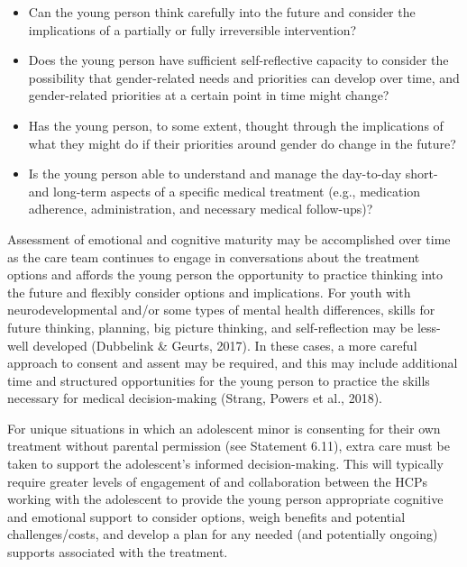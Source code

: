 \documentclass[
]{book}
\providecommand{\tightlist}{%
  \setlength{\itemsep}{0pt}\setlength{\parskip}{0pt}}
\begin{document}
\begin{itemize}
\tightlist
\item
  Can the young person think carefully into the future and consider the implications of a partially or fully irreversible intervention?
\item
  Does the young person have sufficient self-reflective capacity to consider the possibility that gender-related needs and priorities can develop over time, and gender-related priorities at a certain point in time might change?
\item
  Has the young person, to some extent, thought through the implications of what they might do if their priorities around gender do change in the future?
\item
  Is the young person able to understand and manage the day-to-day short- and long-term aspects of a specific medical treatment (e.g., medication adherence, administration, and necessary medical follow-ups)?
\end{itemize}

Assessment of emotional and cognitive maturity may be accomplished over time as the care
team continues to engage in conversations about
the treatment options and affords the young person the opportunity to practice thinking into
the future and flexibly consider options and
implications. For youth with neurodevelopmental
and/or some types of mental health differences,
skills for future thinking, planning, big picture
thinking, and self-reflection may be less-well
developed (Dubbelink \& Geurts, 2017). In these
cases, a more careful approach to consent and
assent may be required, and this may include
additional time and structured opportunities for
the young person to practice the skills necessary
for medical decision-making (Strang, Powers
et al., 2018).

For unique situations in which an adolescent
minor is consenting for their own treatment without parental permission (see Statement 6.11),
extra care must be taken to support the adolescent's informed decision-making. This will typically require greater levels of engagement of and
collaboration between the HCPs working with
the adolescent to provide the young person
appropriate cognitive and emotional support to
consider options, weigh benefits and potential
challenges/costs, and develop a plan for any
needed (and potentially ongoing) supports associated with the treatment.
\end{document}
